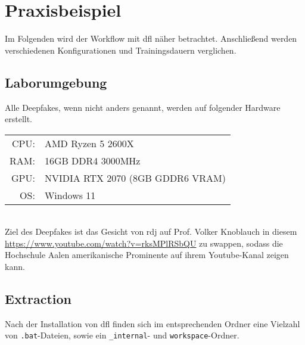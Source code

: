 \section{Praxisbeispiel}\label{sec:praxisbeispiel}
Im Folgenden wird der Workflow mit \gls{dfl} näher betrachtet.
Anschließend werden verschiedenen Konfigurationen und Trainingsdauern verglichen.

\subsection{Laborumgebung}\label{subsec:laborumgebung}
Alle Deepfakes, wenn nicht anders genannt, werden auf folgender Hardware erstellt.\\[0.5cm]
\begin{tabular}{rl}
    CPU:& AMD Ryzen 5 2600X\\
    RAM:& 16GB DDR4 3000MHz\\
    GPU:& NVIDIA RTX 2070 (8GB GDDR6 VRAM)\\
    OS:& Windows 11
\end{tabular}\\[0.5cm]

Ziel des Deepfakes ist das Gesicht von \gls{rdj} auf Prof. Volker Knoblauch in diesem \href{Video}{https://www.youtube.com/watch?v=rksMPlRSbQU} zu swappen,
sodass die Hochschule Aalen amerikanische Prominente auf ihrem Youtube-Kanal zeigen kann.

\subsection{Extraction}
Nach der Installation von \gls{dfl} finden sich im entsprechenden Ordner eine Vielzahl von \texttt{.bat}-Dateien, sowie ein \texttt{\_internal}- und \texttt{workspace}-Ordner.
